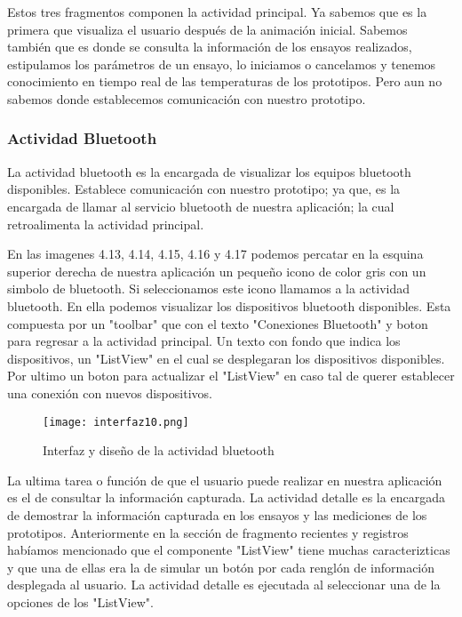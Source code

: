 \par \noindent
Estos tres fragmentos componen la actividad principal. Ya sabemos que es la primera que visualiza el usuario después de la animación inicial. Sabemos también que es donde se consulta la información de los ensayos realizados, estipulamos los parámetros de un ensayo, lo iniciamos o cancelamos y tenemos conocimiento en tiempo real de las temperaturas de los prototipos. Pero aun no sabemos donde establecemos comunicación con nuestro prototipo. 

\subsubsection{Actividad Bluetooth}

\par 
La actividad bluetooth es la encargada de visualizar los equipos bluetooth disponibles. Establece comunicación con nuestro prototipo; ya que, es la encargada de llamar al servicio bluetooth de nuestra aplicación; la cual retroalimenta la actividad principal.

\par \noindent
En las imagenes 4.13, 4.14, 4.15, 4.16 y 4.17 podemos percatar en la esquina superior derecha de nuestra aplicación un pequeño icono de color gris con un simbolo de bluetooth. Si seleccionamos este icono llamamos a la actividad bluetooth. En ella podemos visualizar los dispositivos bluetooth disponibles. Esta compuesta por un "toolbar" que con el texto "Conexiones Bluetooth" y boton para regresar a la actividad principal. Un texto con fondo que indica los dispositivos, un "ListView" en el cual se desplegaran los dispositivos disponibles. Por ultimo un boton para actualizar el "ListView" en caso tal de querer establecer una conexión con nuevos dispositivos.

\begin{figure}[H]
	\centering
	\texttt{[image: interfaz10.png]}
	\caption{Interfaz y diseño de la actividad bluetooth}
\end{figure}

\par \noindent
La ultima tarea o función de que el usuario puede realizar en nuestra aplicación es el de consultar la información capturada. La actividad detalle es la encargada de demostrar la información capturada en los ensayos y las mediciones de los prototipos. Anteriormente en la sección de fragmento recientes y registros habíamos mencionado que el componente "ListView" tiene muchas caracterizticas y que una de ellas era la de simular un botón por cada renglón de información desplegada al usuario. La actividad detalle es ejecutada al seleccionar una de la opciones de los "ListView".

